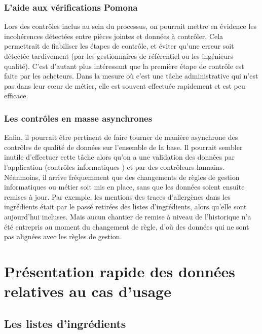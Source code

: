             \subsection{L'aide aux vérifications Pomona}
            Lors des contrôles inclus au sein du processus, on pourrait mettre en évidence les incohérences détectées entre pièces jointes et données à contrôler.
            Cela permettrait de fiabiliser les étapes de contrôle, et éviter qu'une erreur soit détectée tardivement (par les gestionnaires de référentiel ou les ingénieurs qualité).
            C'est d'autant plus intéressant que la première étape de contrôle est faite par les acheteurs.
            Dans la mesure où c'est une tâche administrative qui n'est pas dans leur c{\oe}ur de métier, elle est souvent effectuée rapidement et est peu efficace.

            \subsection{Les contrôles en masse asynchrones}
            Enfin, il pourrait être pertinent de faire tourner de manière asynchrone des contrôles de qualité de données sur l'ensemble de la base.
            Il pourrait sembler inutile d'effectuer cette tâche alors qu'on a une validation des données par l'application (contrôles \og informatiques \fg) et par des contrôleurs humains.
            Néanmoins, il arrive fréquemment que des changements de règles de gestion informatiques ou métier soit mis en place, sans que les données soient ensuite remises à jour.
            Par exemple, les mentions des traces d'allergènes dans les ingrédients était par le passé retirées des listes d'ingrédients, alors qu'elle sont aujourd'hui incluses. 
            Mais aucun chantier de remise à niveau de l'historique n'a été entrepris au moment du changement de règle, d'où des données qui ne sont pas alignées avec les règles de gestion.


    \chapter{Présentation rapide des données relatives au cas d'usage}

        \section{Les listes d'ingrédients}
        \label{listes_ingredients}

